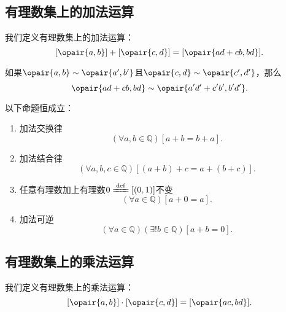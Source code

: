 \subsection{有理数集上的加法运算}
我们定义有理数集上的加法运算：
\begin{equation}\label{equation:集合论.有理数集上的加法运算}
	[\opair{a,b}]+[\opair{c,d}]=[\opair{ad+cb,bd}].
\end{equation}

\begin{lemma}\label{theorem:集合论.有理数集上的加法运算是良定的}
如果\(\opair{a,b}\sim\opair{a',b'}\)且\(\opair{c,d}\sim\opair{c',d'}\)，那么\[
	\opair{ad+cb,bd}\sim\opair{a'd'+c'b',b'd'}.
\]
\end{lemma}

\begin{theorem}\label{theorem:集合论.有理数加法的运算法则}
以下命题恒成立：
\begin{enumerate}
	\item 加法交换律
	\begin{equation}\label{equation:集合论.有理数加法交换律}
		(\forall a,b\in\mathbb{Q})[a+b=b+a].
	\end{equation}
	\item 加法结合律
	\begin{equation}\label{equation:集合论.有理数加法结合律}
		(\forall a,b,c\in\mathbb{Q})[(a+b)+c=a+(b+c)].
	\end{equation}
	\item 任意有理数加上有理数\(0\defeq[(0,1)]\)不变
	\begin{equation}\label{equation:集合论.任意有理数加上零不变}
		(\forall a\in\mathbb{Q})[a+0=a].
	\end{equation}
	\item 加法可逆
	\begin{equation}\label{equation:集合论.有理数加法可逆}
		(\forall a\in\mathbb{Q})(\exists!b\in\mathbb{Q})[a+b=0].
	\end{equation}
\end{enumerate}
\end{theorem}

\subsection{有理数集上的乘法运算}
我们定义有理数集上的乘法运算：
\begin{equation}\label{equation:集合论.有理数集上的乘法运算}
	[\opair{a,b}]\cdot[\opair{c,d}]=[\opair{ac,bd}].
\end{equation}

